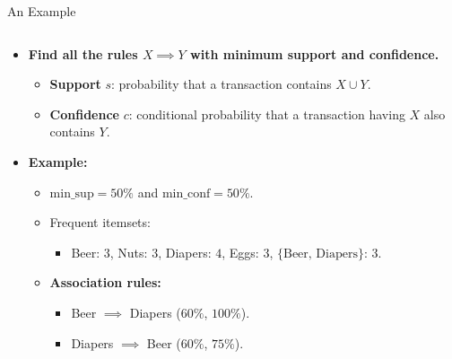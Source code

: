 \begin{frame}{An Example}
\begin{columns}
\begin{column}{0.5\textwidth}
			\begin{itemize}
				\item \textbf{Find all the rules $X \implies Y$ with minimum 
				support and confidence.}
				\begin{itemize}
					\item \textbf{Support} $s$: probability that a transaction 
					contains $X \cup Y$.
					\item \textbf{Confidence} $c$: conditional probability that 
					a transaction having $X$ also contains $Y$.
				\end{itemize}
				\item \textbf{Example:}
				\begin{itemize}
					\item $\text{min\_sup} = 50\%$ and $\text{min\_conf} = 
					50\%$.
					\item Frequent itemsets:
					\begin{itemize}
						\item Beer: $3$, Nuts: $3$, Diapers: $4$, Eggs: $3$, 
						$\{\text{Beer, Diapers}\}$: $3$.
					\end{itemize}
					\item \textbf{Association rules:}
					\begin{itemize}
						\item Beer $\implies$ Diapers ($60\%$, $100\%$).
						\item Diapers $\implies$ Beer ($60\%$, $75\%$).
					\end{itemize}
				\end{itemize}
			\end{itemize}
		\end{column}
	\end{columns}
\end{frame}

